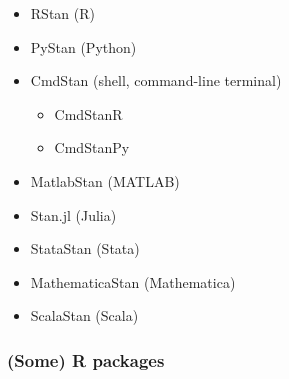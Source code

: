 \documentclass[
  11pt,
]{article}
\providecommand{\tightlist}{%
  \setlength{\itemsep}{0pt}\setlength{\parskip}{0pt}}
\begin{document}
\begin{itemize}
\tightlist
\item
  RStan (R)
\item
  PyStan (Python)
\item
  CmdStan (shell, command-line terminal)

  \begin{itemize}
  \tightlist
  \item
    CmdStanR
  \item
    CmdStanPy
  \end{itemize}
\item
  MatlabStan (MATLAB)
\item
  Stan.jl (Julia)
\item
  StataStan (Stata)
\item
  MathematicaStan (Mathematica)
\item
  ScalaStan (Scala)
\end{itemize}

\hypertarget{some-r-packages}{%
\subsubsection{(Some) R packages}\label{some-r-packages}}
\end{document}
